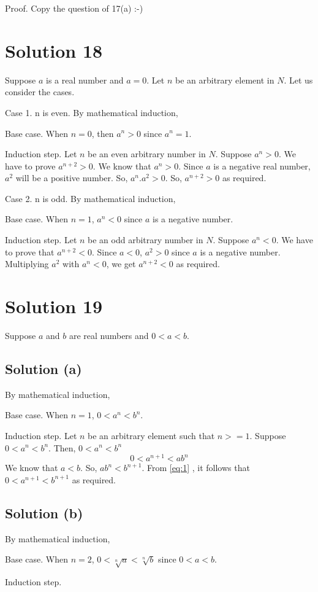 \documentclass{article}
\begin{document}
Proof. Copy the question of 17(a) :-)

\section{Solution 18}
Suppose $a$ is a real number and $a = 0$. Let $n$ be an arbitrary
element in $N$. Let us consider the cases.

Case 1. n is even. By mathematical induction,

Base case. When $n = 0$, then $a^n > 0$ since $a^n = 1$.

Induction step. Let $n$ be an even arbitrary number in $N$. Suppose
$a^n > 0$. We have to prove $a^{n+2} > 0$. We know that $a^n > 0$.
Since $a$ is a negative real number, $a^2$ will be a positive number.
So, $a^n.a^2 > 0$. So, $a^{n+2} > 0$ as required.

Case 2. n is odd. By mathematical induction,

Base case. When $n=1$, $a^{n} < 0$ since $a$ is a negative number.

Induction step. Let $n$ be an odd arbitrary number in $N$. Suppose
$a^n < 0$. We have to prove that $a^{n+2} < 0$. Since $a < 0$, $a^2 >
0$ since $a$ is a negative number. Multiplying $a^2$ with $a^n < 0$,
we get $a^{n+2} < 0$ as required.

\section{Solution 19}
Suppose $a$ and $b$ are real numbers and $0 < a < b$.
\subsection{Solution (a)}
By mathematical induction,

Base case. When $n=1$, $0 < a^n < b^n$.

Induction step. Let $n$ be an arbitrary element such that $n>= 1$.
Suppose $0 < a^n < b^n$. Then,
$0 < a^n < b^n$ \\
\begin{equation}\label{eq:1}
  0 < a^{n+1} < ab^n
\end{equation}
We know that $a < b$. So, $ab^n < b^{n+1}$. From \ref{eq:1} , it follows
that $0 < a^{n+1} < b^{n+1}$ as required.

\subsection{Solution (b)}
By mathematical induction,

Base case. When $n = 2$, $0 < \sqrt[n]{a} < \sqrt[n]{b}$ since $0 < a
< b$.

Induction step.
\end{document}
